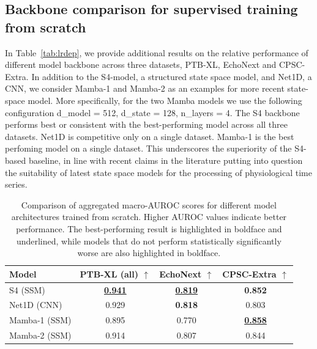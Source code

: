 \documentclass{article}
\begin{document}
        \subsection{Backbone comparison for supervised training from scratch}\label{app:ssm}
        In Table~\ref{tab:lrdep}, we provide additional results on the relative performance of different model backbone across three datasets, PTB-XL, EchoNext and CPSC-Extra. In addition to the S4-model, a structured state space model, and Net1D, a CNN, we consider Mamba-1 \citep{gu2024mamba} and Mamba-2 \citep{dao2024transformers} as an examples for more recent state-space model. More specifically, for the two Mamba models we use the following configuration d\_model = 512, d\_state = 128, n\_layers = 4. The S4 backbone performs best or consistent with the best-performing model  across all three datasets. Net1D is competitive only on a single dataset. Mamba-1 is the best perfoming model on a single dataset. This underscores the superiority of the S4-based baseline, in line with recent claims in the literature \citep{somvanshi2025s4,patro2024mamba} putting into question the suitability of latest state space models for the processing of physiological time series.

        \begin{table}[htbp]
            \centering
            \caption{Comparison of aggregated macro-AUROC scores for different model architectures trained from scratch. Higher AUROC values indicate better performance. The best-performing result is highlighted in boldface and underlined, while models that do not perform statistically significantly worse are also highlighted in boldface.}
            \begin{tabular}{lccc}
                \toprule
                \textbf{Model} & \textbf{PTB-XL (all)} $\uparrow$ & \textbf{EchoNext} $\uparrow$ & \textbf{CPSC-Extra} $\uparrow$ \\
                \midrule
                S4 (SSM) & \underline{\textbf{0.941}} & \underline{\textbf{0.819}} & \textbf{0.852} \\
                Net1D (CNN) & 0.929 & \textbf{0.818} & 0.803 \\
                Mamba-1 (SSM) & 0.895 & 0.770 & \underline{\textbf{0.858}} \\
                Mamba-2 (SSM) & 0.914 & 0.807 & 0.844 \\
        
                \bottomrule
            \end{tabular}
            \label{tab:mamba_comparison_v1_v2}
        \end{table}
\end{document}
